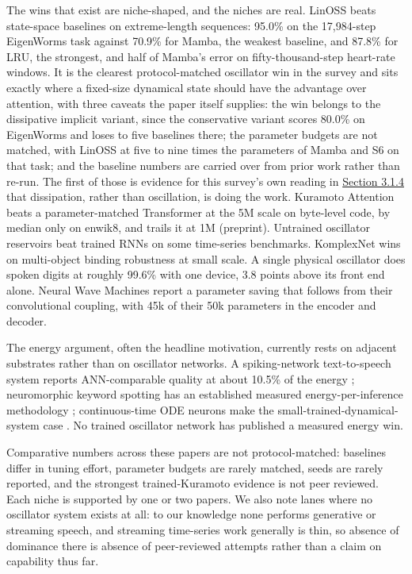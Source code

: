 \documentclass[10pt]{article}
\newcounter{none} %
\begin{document}
The wins that exist are niche-shaped, and the niches are real. LinOSS
beats state-space baselines on extreme-length sequences: 95.0\% on the
17,984-step EigenWorms task against 70.9\% for Mamba, the weakest
baseline, and 87.8\% for LRU, the strongest, and half of Mamba's error
on fifty-thousand-step heart-rate windows. It is the clearest
protocol-matched oscillator win in the survey and sits exactly where a
fixed-size dynamical state should have the advantage over attention,
with three caveats the paper itself supplies: the win belongs to the
dissipative implicit variant, since the conservative variant scores
80.0\% on EigenWorms and loses to five baselines there; the parameter
budgets are not matched, with LinOSS at five to nine times the
parameters of Mamba and S6 on that task; and the baseline numbers are
carried over from prior work rather than re-run. The first of those is
evidence for this survey's own reading in \hyperref[sec-3-1-4]{Section
3.1.4} that dissipation, rather than oscillation, is doing the work.
Kuramoto Attention beats a parameter-matched Transformer at the 5M scale
on byte-level code, by median only on enwik8, and trails it at 1M
(preprint). Untrained oscillator reservoirs beat trained RNNs on some
time-series benchmarks. KomplexNet wins on multi-object binding
robustness at small scale. A single physical oscillator does spoken
digits at roughly 99.6\% with one device, 3.8 points above its front end
alone. Neural Wave Machines report a parameter saving that follows from
their convolutional coupling, with 45k of their 50k parameters in the
encoder and decoder.

The energy argument, often the headline motivation, currently rests on
adjacent substrates rather than on oscillator networks. A
spiking-network text-to-speech system reports ANN-comparable quality at
about 10.5\% of the energy \citep{spikevoice}; neuromorphic keyword
spotting has an established measured energy-per-inference methodology
\citep{blouw2018}; continuous-time ODE neurons make the
small-trained-dynamical-system case \citep{ltc, cfc}. No trained
oscillator network has published a measured energy win.

Comparative numbers across these papers are not protocol-matched:
baselines differ in tuning effort, parameter budgets are rarely matched,
seeds are rarely reported, and the strongest trained-Kuramoto evidence
is not peer reviewed. Each niche is supported by one or two papers. We
also note lanes where no oscillator system exists at all: to our
knowledge none performs generative or streaming speech, and streaming
time-series work generally is thin, so absence of dominance there is
absence of peer-reviewed attempts rather than a claim on capability thus
far.
\end{document}
